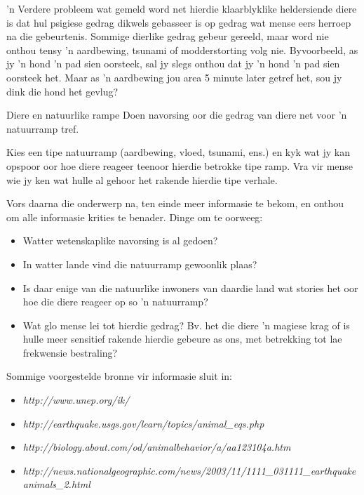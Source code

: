       \label{m38779*id6489198} 'n Verdere probleem wat gemeld word net hierdie klaarblyklike heldersiende diere is dat hul psigiese gedrag dikwels gebasseer is op gedrag wat mense eers herroep na die gebeurtenis. Sommige dierlike gedrag gebeur gereeld, maar word nie onthou tensy 'n aardbewing, tsunami of modderstorting volg nie. Byvoorbeeld, as jy 'n hond 'n pad sien oorsteek, sal jy slegs onthou dat jy 'n hond 'n pad sien oorsteek het. Maar as 'n aardbewing jou area 5 minute later getref het, sou jy dink die hond het gevlug?  \par 
      \label{m38779*id1553831}
            \begin{project}{Diere en natuurlike rampe}
            \nopagebreak
        \label{m38779*id1164119615164} Doen navorsing oor die gedrag van diere net voor 'n natuurramp tref. \par 
        \label{m38779*id1164121934705} Kies een tipe natuurramp (aardbewing, vloed, tsunami, ens.) en kyk wat jy kan opspoor oor hoe diere reageer teenoor hierdie betrokke tipe ramp. Vra vir mense wie jy ken wat hulle al gehoor het rakende hierdie tipe verhale.\par 
        \label{m38779*id1164121037612} Vors daarna die onderwerp na, ten einde meer informasie te bekom, en onthou om alle informasie krities te benader. Dinge om te oorweeg: \par 
        \label{m38779*id1164128014077}\begin{itemize}[noitemsep]
            \item Watter wetenskaplike navorsing is al gedoen?   
\item In watter lande vind die natuurramp gewoonlik plaas? 
\item Is daar enige van die natuurlike inwoners van daardie land wat stories het oor hoe die diere reageer op so 'n natuurramp?  
\item Wat glo mense lei tot hierdie gedrag? Bv. het die diere 'n magiese krag of is hulle meer sensitief rakende hierdie gebeure as ons, met betrekking tot lae frekwensie bestraling? \end{itemize}
Sommige voorgestelde bronne vir informasie sluit in:
\begin{itemize}[noitemsep]
\item \textsl{http://www.unep.org/ik/}
\item \textsl{http://earthquake.usgs.gov/learn/topics/animal\_eqs.php}
\item \textsl{http://biology.about.com/od/animalbehavior/a/aa123104a.htm} 
\item \textsl{http://news.nationalgeographic.com/news/2003/11/1111\_031111\_earthquakeanimals\_2.html}

\end{itemize}
\end{project}
